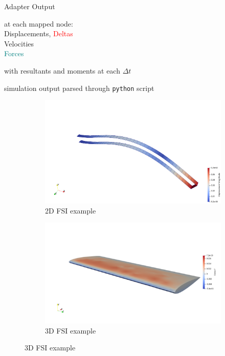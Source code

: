 \documentclass[10pt,t]{beamer}
\begin{document}
\begin{frame}{Adapter Output}

\begin{description}
    \item[*.vtu files] at each mapped node: \\
                    \textcolor{dorange}{Displacements}, \textcolor{red}{Deltas}\\ 
                    \textcolor{dblue}{Velocities}\\
                    \textcolor{teal}{Forces}
    \item[csv file] with resultants and moments at each $\Delta t$
    \item[MDByn] simulation output parsed through \texttt{python} script
\end{description}



\begin{figure}
 \begin{subfigure}[t]{.486\textwidth}
    \centering
    \includegraphics[width=\linewidth, trim=20 0 0 200,clip]{images/fsi2_disp.png}
    \caption{2D FSI example}
  \end{subfigure}
  \hfill
  \begin{subfigure}[t]{.486\textwidth}
    \centering
    \includegraphics[width=\linewidth]{images/naca_force.png}
    \caption{3D FSI example}
  \end{subfigure}
\end{figure}


\end{frame}
\end{document}
